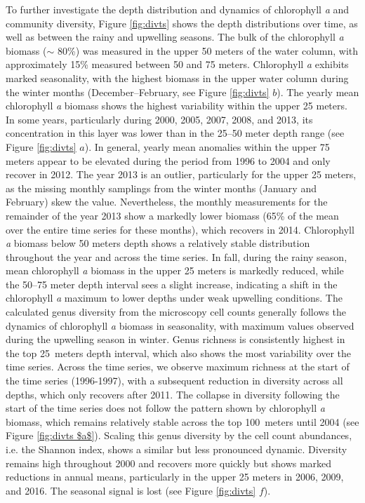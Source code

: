 \documentclass[draft]{agujournal2019}
\begin{document}
To further investigate the depth distribution and dynamics of chlorophyll \textit{a} and community diversity, Figure \ref{fig:divts} shows the depth distributions over time, as well as between the rainy and upwelling seasons. The bulk of the chlorophyll \textit{a} biomass ($\sim$ 80\%) was measured in the upper 50 meters of the water column, with approximately 15\% measured between 50 and 75 meters. Chlorophyll \textit{a} exhibits marked seasonality, with the highest biomass in the upper water column during the winter months (December–February, see Figure \ref{fig:divts} $b$). The yearly mean chlorophyll \textit{a} biomass shows the highest variability within the upper 25 meters. In some years, particularly during 2000, 2005, 2007, 2008, and 2013, its concentration in this layer was lower than in the 25–50 meter depth range (see Figure \ref{fig:divts} $a$). In general, yearly mean anomalies within the upper 75 meters appear to be elevated during the period from 1996 to 2004 and only recover in 2012. The year 2013 is an outlier, particularly for the upper 25 meters, as the missing monthly samplings from the winter months (January and February) skew the value. Nevertheless, the monthly measurements for the remainder of the year 2013 show a markedly lower biomass (65\% of the mean over the entire time series for these months), which recovers in 2014. Chlorophyll \textit{a} biomass below 50 meters depth shows a relatively stable distribution throughout the year and across the time series. In fall, during the rainy season, mean chlorophyll \textit{a} biomass in the upper 25 meters is markedly reduced, while the 50–75 meter depth interval sees a slight increase, indicating a shift in the chlorophyll \textit{a} maximum to lower depths under weak upwelling conditions.
The calculated genus diversity from the microscopy cell counts generally follows the dynamics of chlorophyll \textit{a} biomass in seasonality, with maximum values observed during the upwelling season in winter. Genus richness is consistently highest in the top \qty{25}{meters} depth interval, which also shows the most variability over the time series. Across the time series, we observe maximum richness at the start of the time series (1996-1997), with a subsequent reduction in diversity across all depths, which only recovers after 2011. The collapse in diversity following the start of the time series does not follow the pattern shown by chlorophyll \textit{a} biomass, which remains relatively stable across the top \qty{100}{meters} until 2004 (see Figure \ref{fig:divts $a$}). Scaling this genus diversity by the cell count abundances, i.e. the Shannon index, shows a similar but less pronounced dynamic. Diversity remains high throughout 2000 and recovers more quickly but shows marked reductions in annual means, particularly in the upper 25 meters in 2006, 2009, and 2016. The seasonal signal is lost (see Figure \ref{fig:divts} $f$). 
\end{document}
